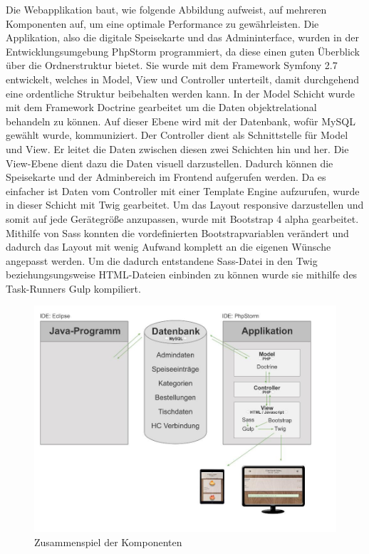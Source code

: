 Die Webapplikation baut, wie folgende Abbildung aufweist, auf mehreren Komponenten auf, um eine optimale Performance zu gewährleisten.
Die Applikation, also die digitale Speisekarte und das Admininterface, wurden in der Entwicklungsumgebung PhpStorm programmiert, da diese einen guten Überblick über die Ordnerstruktur bietet.
Sie wurde mit dem Framework Symfony 2.7 entwickelt, welches in Model, View und Controller unterteilt, damit durchgehend eine ordentliche Struktur beibehalten werden kann. In der Model Schicht wurde mit dem Framework Doctrine gearbeitet um die Daten objektrelational behandeln zu können. Auf dieser Ebene wird mit der Datenbank, wofür MySQL gewählt wurde, kommuniziert.
Der Controller dient als Schnittstelle für Model und View. Er leitet die Daten zwischen diesen zwei Schichten hin und her.
Die View-Ebene dient dazu die Daten visuell darzustellen. Dadurch können die Speisekarte und der Adminbereich im Frontend aufgerufen werden. Da es einfacher ist Daten vom Controller mit einer Template Engine aufzurufen, wurde in dieser Schicht mit Twig gearbeitet. Um das Layout responsive darzustellen und somit auf jede Gerätegröße anzupassen, wurde mit Bootstrap 4 alpha gearbeitet. Mithilfe von Sass konnten die vordefinierten Bootstrapvariablen verändert und dadurch das Layout mit wenig Aufwand komplett an die eigenen Wünsche angepasst werden.
Um die dadurch entstandene Sass-Datei in den Twig beziehungsungsweise HTML-Dateien einbinden zu können wurde sie mithilfe des Task-Runners Gulp kompiliert.\\
			\begin{figure}[H]
			\begin{centering}
			\includegraphics[width = 1\textwidth]{Bilder/Jok_zusammenspiel_applikation.jpg}
			\par\end{centering}
			\caption{Zusammenspiel der Komponenten}
			\label{Zusammenspiel der Komponenten}
			\end{figure}

